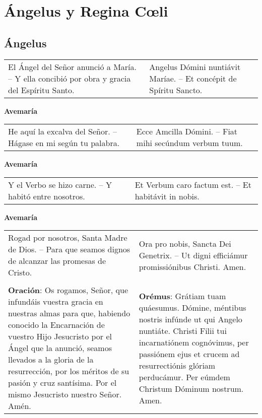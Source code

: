 


\chapter*{Ángelus y Regina Cœli}

\section*{Ángelus}

\begin{longtable} { p{} p{} }
    El Ángel del Señor anunció a María. -- Y ella concibió por obra y gracia del Espíritu Santo.                   
        & 
    Angelus Dómini nuntiávit Maríae. -- Et concépit de Spíritu Sancto.
\end{longtable}

\begin{center}
    \textbf{Avemaría}
\end{center}

\begin{longtable} { p{} p{} }
    He aquí la excalva del Señor. -- Hágase en mi según tu palabra. 
        & 
    Ecce Amcilla Dómini. -- Fiat mihi secúndum verbum tuum.
\end{longtable}

\begin{center}
    \textbf{Avemaría}
\end{center}

\begin{longtable} { p{} p{} }
    Y el Verbo se hizo carne. -- Y habitó entre nosotros.
        & 
    Et Verbum caro factum est. -- Et habitávit in nobis.
\end{longtable}

\begin{center}
    \textbf{Avemaría}
\end{center}

\begin{longtable} { p{} p{} }
    Rogad por nosotros, Santa Madre de Dios. -- Para que seamos dignos de alcanzar las promesas de Cristo.                   
        & 
    Ora pro nobis, Sancta Dei Genetrix. -- Ut digni efficiámur promissiónibus Christi. Amen. \\\\

    \textbf{Oración}: Os rogamos, Señor, que infundáis vuestra gracia en nuestras almas para que,
    habiendo conocido la Encarnación de vuestro Hijo Jesucristo por el Ángel que la anunció,
    seamos llevados a la gloria de la resurrección, por los méritos de su pasión y cruz santísima.
    Por el mismo Jesucristo nuestro Señor. Amén.                  
        &
    \textbf{Orémus}: Grátiam tuam quáesumus. Dómine, méntibus nostris infúnde ut qui Angelo nuntiáte.
    Christi Filii tui incarnatiónem cognóvimus, per passiónem ejus et crucem ad resurrectiónis glóriam perducámur.
    Per eúmdem Christum Dóminum nostrum. Amen.
\end{longtable}

